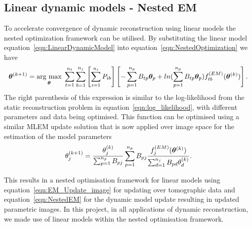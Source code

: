 \subsection{Linear dynamic models - Nested EM}
To accelerate convergence of dynamic reconstruction using linear models the nested optimization framework can be utilised. By substituting the linear model equation~\ref{eqn:LinearDynamicModel} into equation~\ref{eqn:NestedOptimization} we have
\begin{equation}
\bm{\theta}^{(k+1)} = 
\underset{\bm{\theta}}{\operatorname{arg}\,\operatorname{max}}\;
\sum_{t=1}^{n_t} \sum_{b=1}^{n_j} \left[ \sum_{i=1}^{n_i}  P_{ib} \right]
\left[ 
-\sum_{p=1}^{n_p} B_{tp} \bm\theta_{p} + 
ln( \sum_{p=1}^{n_p} B_{tp} \bm\theta_{p}) 
f_{tb}^{(EM)}(\bm{\theta}^{(k)})
\right] \\ .
\end{equation}
The right parenthesis of this expression is similar to the log-likelihood from the static reconstruction problem in equation~\ref{eqn:log_likelihood}, with different parameters and data being optimised. This function can be optimised using a similar MLEM update solution that is now applied over image space for the estimation of the model parameters 
\begin{equation}
\theta_j^{(k+1)} = \frac{\theta_j^{(k)}}
{\sum_{p=1}^{n_p} B_{pj}} 
\sum_{p=1}^{n_p} B_{pj} 
\frac{f_{j}^{(EM)}(\bm{\theta}^{(k)})}{\sum_{d=1}^{n_j} B_{pd}\theta_d^{(k)} } \\.
\label{eqn:NestedEM}
\end{equation}

This results in a nested optimisation framework for linear models using equation~\ref{eqn:EM_Update_image} for updating over tomographic data and equation~\ref{eqn:NestedEM} for the dynamic model update resulting in updated parametric images. 
In this project, in all applications of dynamic reconstruction, we made use of linear models within the nested optimisation framework.